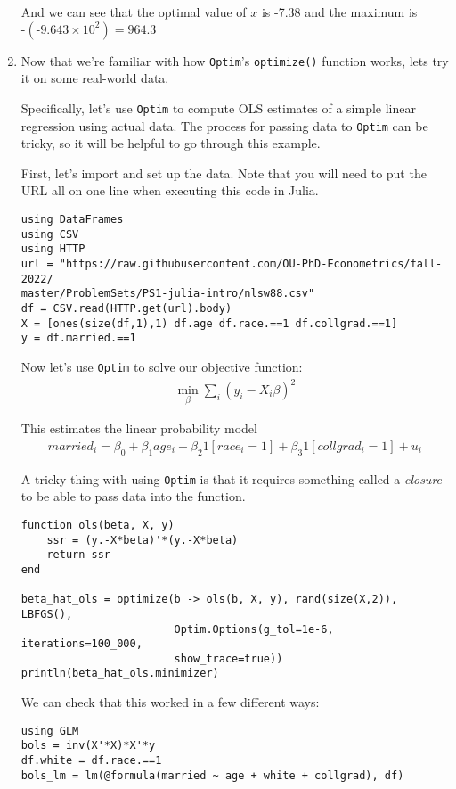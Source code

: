 \documentclass[12pt,english]{article}
\begin{document}
\begin{enumerate}
And we can see that the optimal value of $x$ is -7.38 and the maximum is $\text{-}\left(\text{-}9.643\times 10^2\right)=964.3$

\item Now that we're familiar with how \texttt{Optim}'s \texttt{optimize()} function works, lets try it on some real-world data. 

Specifically, let's use \texttt{Optim} to compute OLS estimates of a simple linear regression using actual data. The process for passing data to \texttt{Optim} can be tricky, so it will be helpful to go through this example.

First, let's import and set up the data. Note that you will need to put the URL all on one line when executing this code in Julia.

\begin{verbatim}
using DataFrames
using CSV
using HTTP
url = "https://raw.githubusercontent.com/OU-PhD-Econometrics/fall-2022/
master/ProblemSets/PS1-julia-intro/nlsw88.csv"
df = CSV.read(HTTP.get(url).body)
X = [ones(size(df,1),1) df.age df.race.==1 df.collgrad.==1]
y = df.married.==1
\end{verbatim}

Now let's use \texttt{Optim} to solve our objective function:
\begin{align*}
    \min_\beta \sum_i\left(y_i - 
    X_i\beta\right)^2
\end{align*}

This estimates the linear probability model
\begin{align*}
    married_i = \beta_0 + \beta_1 age_i + \beta_2 1[race_i=1] + \beta_3 1[collgrad_i=1] + u_i
\end{align*}

A tricky thing with using \texttt{Optim} is that it requires something called a \textit{closure} to be able to pass data into the function.

\begin{verbatim}
function ols(beta, X, y)
    ssr = (y.-X*beta)'*(y.-X*beta)
    return ssr
end

beta_hat_ols = optimize(b -> ols(b, X, y), rand(size(X,2)), LBFGS(), 
                        Optim.Options(g_tol=1e-6, iterations=100_000, 
                        show_trace=true))
println(beta_hat_ols.minimizer)
\end{verbatim}

We can check that this worked in a few different ways:

\begin{verbatim}
using GLM
bols = inv(X'*X)*X'*y
df.white = df.race.==1
bols_lm = lm(@formula(married ~ age + white + collgrad), df)
\end{verbatim}


\end{enumerate}
\end{document}
